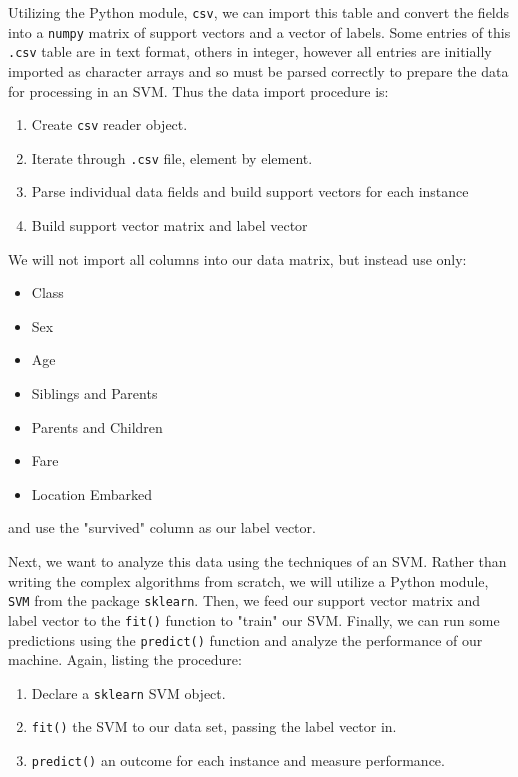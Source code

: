 \documentclass[11pt,a4paper]{article}
\begin{document}
Utilizing the Python module, \verb|csv|, we can import this table and convert the fields into a \verb|numpy| matrix of support vectors and a vector of labels. Some entries of this \verb|.csv| table are in text format, others in integer, however all entries are initially imported as character arrays and so must be parsed correctly to prepare the data for processing in an SVM. Thus the data import procedure is:

\begin{enumerate}
\item Create \verb|csv| reader object.
\item Iterate through \verb|.csv| file, element by element.
\item Parse individual data fields and build support vectors for each instance
\item Build support vector matrix and label vector
\end{enumerate}

We will not import all columns into our data matrix, but instead use only:

\begin{itemize}
\item Class
\item Sex
\item Age
\item Siblings and Parents
\item Parents and Children
\item Fare
\item Location Embarked
\end{itemize}

and use the "survived" column as our label vector.

Next, we want to analyze this data using the techniques of an SVM. Rather than writing the complex algorithms from scratch, we will utilize a Python module, \verb|SVM| from the package \verb|sklearn|. Then, we feed our support vector matrix and label vector to the \verb|fit()| function to "train" our SVM. Finally, we can run some predictions using the \verb|predict()| function and analyze the performance of our machine. Again, listing the procedure:

\begin{enumerate}
\item Declare a \verb|sklearn| SVM object.
\item \verb|fit()| the SVM to our data set, passing the label vector in.
\item \verb|predict()| an outcome for each instance and measure performance.
\end{enumerate}
\end{document}
